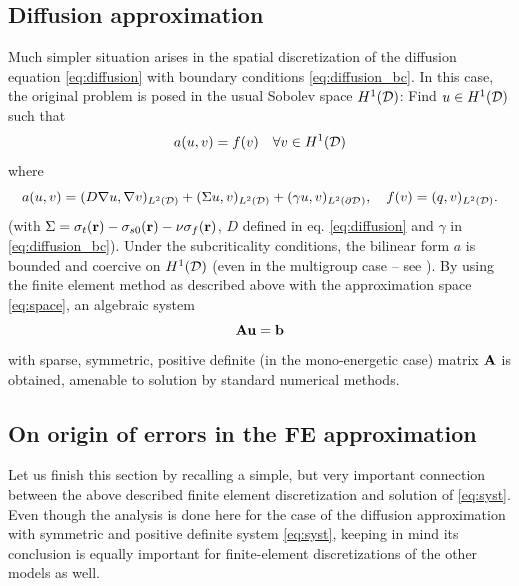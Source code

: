 \subsection{Diffusion approximation}\label{sec:diffusion_weak}

Much simpler situation arises in the spatial discretization of the diffusion equation \eqref{eq:diffusion} with boundary
conditions \eqref{eq:diffusion_bc}. In this case, the original problem is posed in the usual Sobolev space $H^1(\VV)$: 
Find $u\in H^1(\VV)$ such that
\begin{equation}\label{eq:dif_bil_ex}
	a(u,v) = f(v)	\quad	\forall v\in H^1(\VV)
\end{equation}
where 
$$ 
	a(u,v) = (D\nabla u, \nabla v)_{\Lp[2](\VV)} + (\Sigma u, v)_{\Lp[2](\VV)} + (\gamma u, v)_{\Lp[2](\pV)},\quad
	f(v) = (q,v)_{\Lp[2](\VV)}.
$$
(with $\Sigma = \sigma_t(\br) - \sigma_{s0}(\br)  - \nu\sigma_f(\br)$, $D$ defined in eq. \eqref{eq:diffusion} and
$\gamma$ in \eqref{eq:diffusion_bc}).
Under the subcriticality conditions, the bilinear form $a$ is bounded and coercive on $H^1(\VV)$ (even in the multigroup
case -- see \cite[Chap. VII]{DautrayLions2}). By using the finite element method as described
above with the approximation space \eqref{eq:space}, an algebraic system
\begin{equation}\label{eq:syst}
	\mat{A}\mat{u} = \mat{b}
\end{equation}
with sparse, symmetric, positive definite (in the mono-energetic case) matrix $\mat{A}$ is obtained, amenable to
solution by standard numerical methods.


\subsection{On origin of errors in the FE approximation}
Let us finish this section by recalling a simple, but very important connection between the above described finite
element discretization and solution of \eqref{eq:syst}. Even though the
analysis is done here for the case of the diffusion approximation with symmetric and positive definite system
\eqref{eq:syst}, keeping in mind its conclusion is equally important for finite-element discretizations of the other
models as well.

